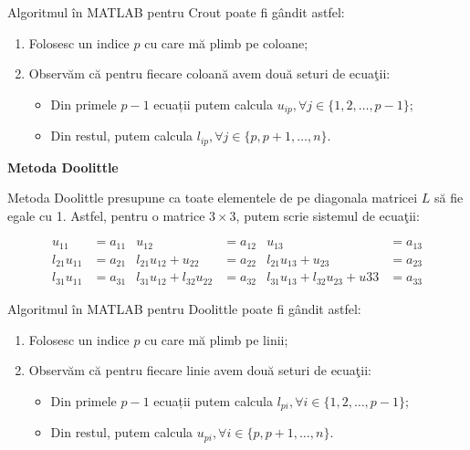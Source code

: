 \documentclass{exam}
\newcommand{\octavescript}[2]{
	
}
\begin{document}
\par Algoritmul în MATLAB pentru Crout poate fi gândit astfel:

\begin{enumerate}
	\item Folosesc un indice $p$ cu care mă plimb pe coloane;
	\item Observăm că pentru fiecare coloană avem două seturi de ecuaţii:
	      \begin{itemize}
		      \item Din primele $p - 1$ ecuații putem calcula $u_{ip}, \forall j \in \{1, 2, \ldots, p - 1\}$;
		      \item Din restul, putem calcula $l_{ip}, \forall j \in \{p, p + 1, \ldots, n\}$.
	      \end{itemize}
\end{enumerate}

\newpage
\octavescript{./src/crout.m}{}

\textbf{Metoda Doolittle}

\par Metoda Doolittle presupune ca toate elementele de pe diagonala matricei $L$
să fie egale cu 1. Astfel, pentru o matrice $3 \times 3$, putem scrie sistemul
de ecuaţii:

\begin{align*}
	u_{11}       & = a_{11} & u_{12}                      & = a_{12} & u_{13}                              & = a_{13} \\
	l_{21}u_{11} & = a_{21} & l_{21}u_{12} + u_{22}       & = a_{22} & l_{21}u_{13} + u_{23}               & = a_{23} \\
	l_{31}u_{11} & = a_{31} & l_{31}u_{12} + l_{32}u_{22} & = a_{32} & l_{31}u_{13} + l_{32}u_{23} + u{33} & = a_{33}
\end{align*}

\par Algoritmul în MATLAB pentru Doolittle poate fi gândit astfel:

\begin{enumerate}
	\item Folosesc un indice $p$ cu care mă plimb pe linii;
	\item Observăm că pentru fiecare linie avem două seturi de ecuaţii:
	      \begin{itemize}
		      \item Din primele $p - 1$ ecuații putem calcula $l_{pi}, \forall i \in \{1, 2, \ldots, p - 1\}$;
		      \item Din restul, putem calcula $u_{pi}, \forall i \in \{p, p + 1, \ldots, n\}$.
	      \end{itemize}
\end{enumerate}
\end{document}
